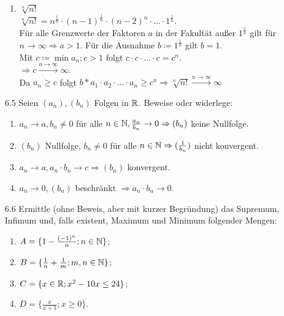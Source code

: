 \documentclass{HM}
\begin{document}
\begin{enumerate}
\begin{enumerate}
		\item $\sqrt[n]{n!}$\\
		$\sqrt[n]{n!}=n^\frac{1}{n}\cdot (n-1)^\frac{1}{n}\cdot (n-2)^n\cdot ... \cdot 1^\frac{1}{n}$.\\
		Für alle Grenzwerte der Faktoren $a$ in der Fakultät außer $1^\frac{1}{n}$ gilt für $n\to\infty \Rightarrow a>1$. Für die Ausnahme $b\coloneqq 1^\frac{1}{n}$ gilt $b=1$.\\
		Mit $c\coloneqq\min{a_n}; c>1$ folgt $c\cdot c \cdot ... \cdot c = c^{n}$.\\
		$\Rightarrow c\xrightarrow{n\to\infty}\infty$.\\
		Da $a_n\geq c$ folgt $b*a_1\cdot a_2\cdot ... \cdot a_n\geq c^n \Rightarrow \sqrt[n]{n!}\xrightarrow{n\to\infty}\infty$
		
	\end{enumerate}
	\item[6.5] Seien $(a_n), (b_n)$ Folgen in $\mathbb{R}$. Beweise oder widerlege:
	\begin{enumerate}
		\item $a_n\to a, b_n\neq 0$ für alle $n\in\mathbb{N}, \frac{a_n}{b_n}\to 0 \Rightarrow (b_n)$ keine Nullfolge.
		\item $(b_n)$ Nullfolge, $b_n\neq 0$ für alle $n\in\mathbb{N}\Rightarrow (\frac{1}{b_n})$ nicht konvergent.
		\item $a_n\to a, a_n\cdot b_n \to c \Rightarrow (b_n)$ konvergent.
		\item $a_n\to 0, (b_n)$ beschränkt $\Rightarrow a_n\cdot b_n \to 0$.
	\end{enumerate}
	\item[6.6] Ermittle (ohne Beweis, aber mit kurzer Begründung) das Supremum, Infimum und, falls existent, Maximum und Minimum folgender Mengen:
	\begin{enumerate}
		\item $A=\lbrace 1-\frac{(-1)^n}{n}; n\in\mathbb{N}\rbrace$;
		\item $B=\lbrace \frac{1}{n}+\frac{1}{m}; m,n\in\mathbb{N}\rbrace$;
		\item $C=\lbrace x\in\mathbb{R}; x^2-10x\leq 24\rbrace$;
		\item $D=\lbrace \frac{x}{x+1}; x\geq 0\rbrace$.
	\end{enumerate}
\end{enumerate}
\end{document}
